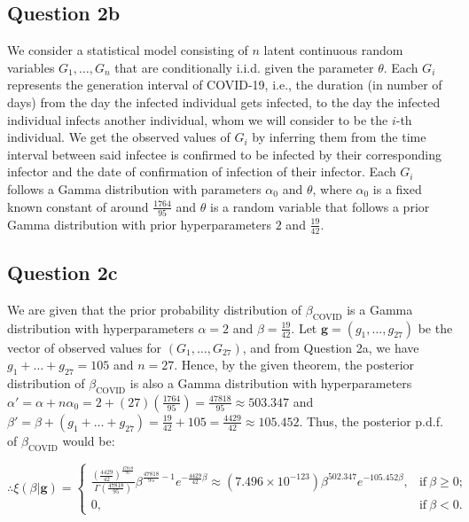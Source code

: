 \documentclass[11pt,fancychapters]{article}
\begin{document}
\subsection*{Question 2b}

We consider a statistical model consisting of $n$ latent continuous random variables $G_1, \dots, G_n$ that are conditionally i.i.d. given the parameter $\theta$. Each $G_i$ represents the generation interval of COVID-19, i.e., the duration (in number of days) from the day the infected individual gets infected, to the day the infected individual infects another individual, whom we will consider to be the $i$-th individual. We get the observed values of $G_i$ by inferring them from the time interval between said infectee is confirmed to be infected by their corresponding infector and the date of confirmation of infection of their infector. Each $G_i$ follows a Gamma distribution with parameters $\alpha_0$ and $\theta$, where $\alpha_0$ is a fixed known constant of around $\frac{1764}{95}$ and $\theta$ is a random variable that follows a prior Gamma distribution with prior hyperparameters $2$ and $\frac{19}{42}$.

\subsection*{Question 2c}

We are given that the prior probability distribution of $\beta_\text{COVID}$ is a Gamma distribution with hyperparameters $\alpha = 2$ and $\beta = \frac{19}{42}$. Let $\boldsymbol{g} = (g_1, \dots, g_{27})$ be the vector of observed values for $(G_1, \dots, G_{27})$, and from Question 2a, we have $g_1 + \dots + g_{27} = 105$ and $n = 27$. Hence, by the given theorem, the posterior distribution of $\beta_\text{COVID}$ is also a Gamma distribution with hyperparameters $\alpha' = \alpha + n\alpha_0 = 2 + (27)(\frac{1764}{95}) = \frac{47818}{95} \approx 503.347$ and $\beta' = \beta + (g_1 + \dots + g_{27}) = \frac{19}{42} + 105 = \frac{4429}{42} \approx 105.452$. Thus, the posterior p.d.f. of $\beta_\text{COVID}$ would be:

\begin{tcolorbox}
\begin{equation}\label{eqn2c1}
    \therefore \xi(\beta | \boldsymbol{g}) = {\begin{cases}{\frac {\left(\frac{4429}{42}\right)^{\frac{47818}{95}}}{\Gamma \left(\frac{47818}{95}\right)} \beta^{\frac{47818}{95} - 1} e^{-\frac{4429}{42} \beta} \approx (7.496 \times 10^{-123}) \beta^{502.347} e^{-105.452 \beta} ,}&\mathrm{if} \ \beta \geq 0;\\[8pt]0,&\mathrm{if} \ \beta < 0.\end{cases}}
\end{equation}
\end{tcolorbox}
\end{document}
